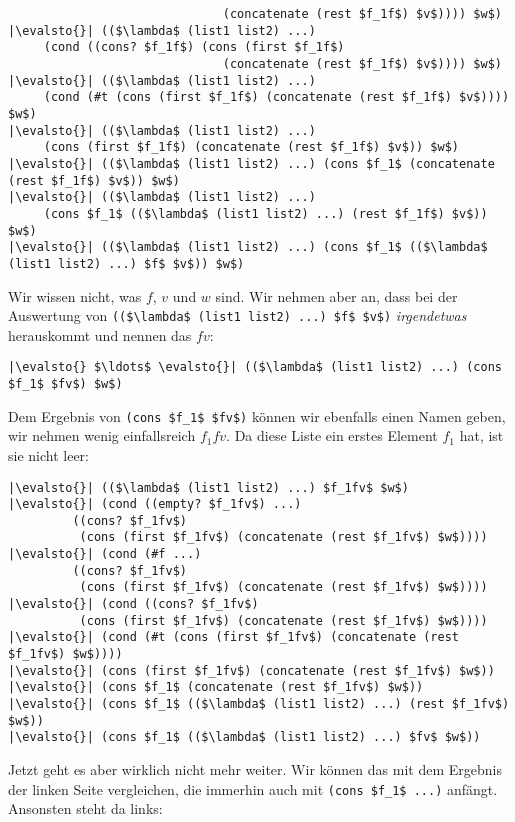 \begin{enumerate}
\begin{lstlisting}
                              (concatenate (rest $f_1f$) $v$)))) $w$)
|\evalsto{}| (($\lambda$ (list1 list2) ...)
     (cond ((cons? $f_1f$) (cons (first $f_1f$)
                              (concatenate (rest $f_1f$) $v$)))) $w$)
|\evalsto{}| (($\lambda$ (list1 list2) ...)
     (cond (#t (cons (first $f_1f$) (concatenate (rest $f_1f$) $v$)))) $w$)
|\evalsto{}| (($\lambda$ (list1 list2) ...) 
     (cons (first $f_1f$) (concatenate (rest $f_1f$) $v$)) $w$)
|\evalsto{}| (($\lambda$ (list1 list2) ...) (cons $f_1$ (concatenate (rest $f_1f$) $v$)) $w$)
|\evalsto{}| (($\lambda$ (list1 list2) ...)
     (cons $f_1$ (($\lambda$ (list1 list2) ...) (rest $f_1f$) $v$)) $w$)
|\evalsto{}| (($\lambda$ (list1 list2) ...) (cons $f_1$ (($\lambda$ (list1 list2) ...) $f$ $v$)) $w$)
\end{lstlisting}
  Wir wissen nicht, was $f$, $v$
  und $w$ sind.  Wir nehmen aber an, dass bei der
  Auswertung von \lstinline{(($\lambda$ (list1 list2) ...) $f$ $v$)}
  \emph{irgendetwas} herauskommt und nennen das $fv$:
\begin{lstlisting}
|\evalsto{} $\ldots$ \evalsto{}| (($\lambda$ (list1 list2) ...) (cons $f_1$ $fv$) $w$)
\end{lstlisting}
  Dem Ergebnis von \lstinline{(cons $f_1$ $fv$)} können wir ebenfalls
  einen Namen geben, wir nehmen wenig einfallsreich $f_1fv$.  Da diese
  Liste ein erstes Element $f_1$ hat, ist sie nicht leer:
%
\begin{lstlisting}
|\evalsto{}| (($\lambda$ (list1 list2) ...) $f_1fv$ $w$)
|\evalsto{}| (cond ((empty? $f_1fv$) ...) 
         ((cons? $f_1fv$)
          (cons (first $f_1fv$) (concatenate (rest $f_1fv$) $w$))))
|\evalsto{}| (cond (#f ...) 
         ((cons? $f_1fv$)
          (cons (first $f_1fv$) (concatenate (rest $f_1fv$) $w$))))
|\evalsto{}| (cond ((cons? $f_1fv$)
          (cons (first $f_1fv$) (concatenate (rest $f_1fv$) $w$))))
|\evalsto{}| (cond (#t (cons (first $f_1fv$) (concatenate (rest $f_1fv$) $w$))))
|\evalsto{}| (cons (first $f_1fv$) (concatenate (rest $f_1fv$) $w$))
|\evalsto{}| (cons $f_1$ (concatenate (rest $f_1fv$) $w$))
|\evalsto{}| (cons $f_1$ (($\lambda$ (list1 list2) ...) (rest $f_1fv$) $w$))
|\evalsto{}| (cons $f_1$ (($\lambda$ (list1 list2) ...) $fv$ $w$))
\end{lstlisting}
\end{enumerate}
%
Jetzt geht es aber wirklich nicht mehr weiter.  Wir können das mit
dem Ergebnis der linken Seite vergleichen, die immerhin auch mit
\lstinline{(cons $f_1$ ...)} anfängt.  Ansonsten steht da links:
% 

